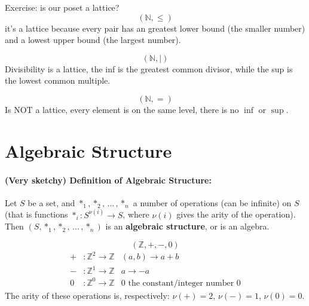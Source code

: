 	\noindent
	Exercise: is our poset a lattice?
	$$ (\mathbb{N}, \leq) $$
	it's a lattice because every pair has an greatest lower bound (the smaller number) and a lowest upper bound (the largest number).

	$$ (\mathbb{N}, |) $$
	Divisibility is a lattice, the inf is the greatest common divisor, while the sup is the lowest common 	multiple.

	$$ (\mathbb{N}, =) $$
	Is NOT a lattice, every element is on the same level, there is no $\inf$ or $\sup$.


%
%
%
%
%
%

	\section{Algebraic Structure}


	\paragraph{(Very sketchy) Definition of Algebraic Structure:} Let $S$ be a set, and $\ast_1, \ast_2, \, ... \, , \ast_n$ a number of operations (can be infinite) on $S$ (that is functions $\ast_i : S^{\nu(i)} \rightarrow S$, where $\nu(i)$ gives the arity of the operation). \\

	\noindent
	Then $(S, \ast_1, \ast_2, \, ... \, , \ast_n)$ is an \textbf{algebraic structure}, or is an algebra. \\

	\begin{example}
	  $$ (\mathbb{Z}, +, -, 0) $$
	  \vspace{-1cm}
	  \begin{align*}
	+ &: \mathbb{Z}^2 \rightarrow \mathbb{Z}  &(a,b) \rightarrow a + b  \\
	- &: \mathbb{Z}^1 \rightarrow \mathbb{Z}  &a \rightarrow - a \\
	0 &: \mathbb{Z}^0 \rightarrow \mathbb{Z}  &0 \text{ the constant/integer number } 0
	\end{align*}
	The arity of these operations is, respectively: $\nu(+) = 2$, $\nu(-) = 1$, $\nu(0) = 0$.
	\end{example}

